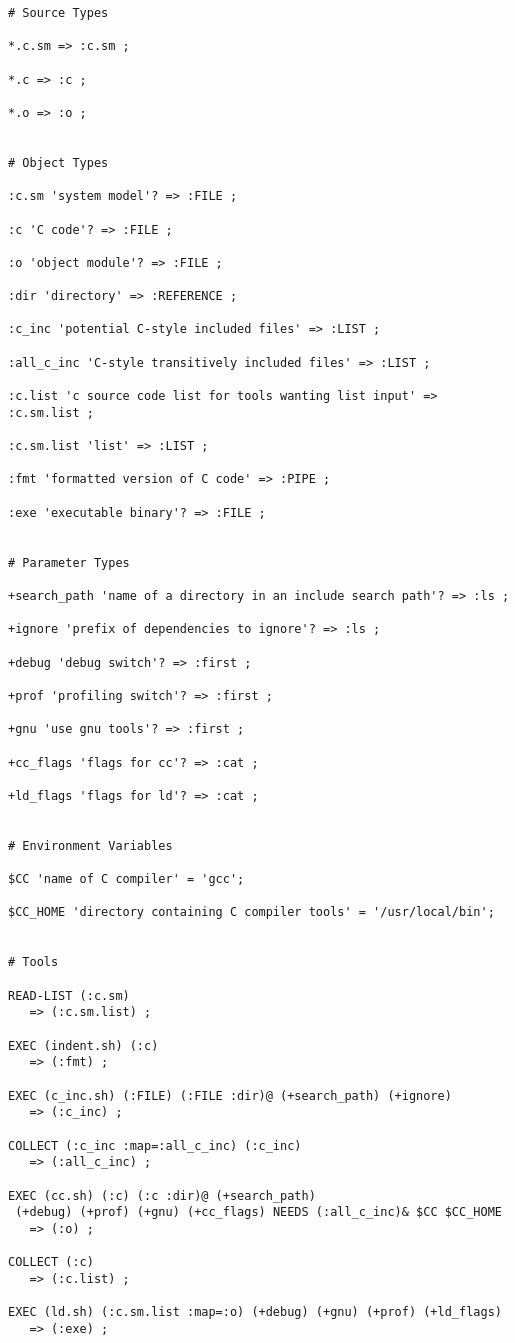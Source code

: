 \documentclass[hidelinks]{report}
\begin{document}
\begin{verbatim}
# Source Types

*.c.sm => :c.sm ;

*.c => :c ;

*.o => :o ;


# Object Types

:c.sm 'system model'? => :FILE ;

:c 'C code'? => :FILE ;

:o 'object module'? => :FILE ;

:dir 'directory' => :REFERENCE ;

:c_inc 'potential C-style included files' => :LIST ;

:all_c_inc 'C-style transitively included files' => :LIST ;

:c.list 'c source code list for tools wanting list input' => :c.sm.list ;

:c.sm.list 'list' => :LIST ;

:fmt 'formatted version of C code' => :PIPE ;

:exe 'executable binary'? => :FILE ;


# Parameter Types

+search_path 'name of a directory in an include search path'? => :ls ;

+ignore 'prefix of dependencies to ignore'? => :ls ;

+debug 'debug switch'? => :first ;

+prof 'profiling switch'? => :first ;

+gnu 'use gnu tools'? => :first ;

+cc_flags 'flags for cc'? => :cat ;

+ld_flags 'flags for ld'? => :cat ;


# Environment Variables

$CC 'name of C compiler' = 'gcc';

$CC_HOME 'directory containing C compiler tools' = '/usr/local/bin';


# Tools

READ-LIST (:c.sm)
   => (:c.sm.list) ;

EXEC (indent.sh) (:c)
   => (:fmt) ;
 
EXEC (c_inc.sh) (:FILE) (:FILE :dir)@ (+search_path) (+ignore)
   => (:c_inc) ;

COLLECT (:c_inc :map=:all_c_inc) (:c_inc)
   => (:all_c_inc) ;

EXEC (cc.sh) (:c) (:c :dir)@ (+search_path)
 (+debug) (+prof) (+gnu) (+cc_flags) NEEDS (:all_c_inc)& $CC $CC_HOME
   => (:o) ;

COLLECT (:c)
   => (:c.list) ;

EXEC (ld.sh) (:c.sm.list :map=:o) (+debug) (+gnu) (+prof) (+ld_flags)
   => (:exe) ;
\end{verbatim}



\end{document}

